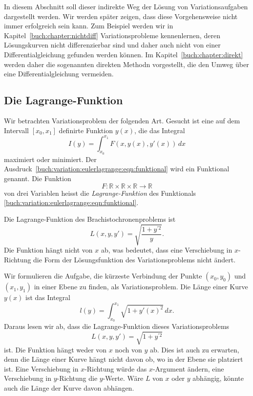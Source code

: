 In diesem Abschnitt soll dieser indirekte Weg der Lösung von
Variationsaufgaben dargestellt werden.
Wir werden später zeigen, dass diese Vorgehensweise nicht immer
erfolgreich sein kann.
Zum Beispiel werden wir in Kapitel~\ref{buch:chapter:nichtdiff}
Variationsprobleme kennenlernen, deren Lösungskurven nicht
differenzierbar sind und daher auch nicht von einer Differentialgleichung
gefunden werden können.
Im Kapitel~\ref{buch:chapter:direkt} werden daher die sogenannten
direkten Methodn vorgestellt, die den Umweg über eine
Differentialgleichung vermeiden.

%
%
\subsection{Die Lagrange-Funktion}
Wir betrachten Variationsproblem der folgenden Art.
Gesucht ist eine auf dem Intervall $[x_0,x_1]$ definirte
Funktion $y(x)$, die das Integral
\begin{equation}
I(y)
=
\int_{x_0}^{x_1}
F(x, y(x), y'(x))
\,dx
\label{buch:variation:eulerlagrange:eqn:funktional}
\end{equation}
maximiert oder minimiert.
Der Ausdruck~\eqref{buch:variation:eulerlagrange:eqn:funktional}
wird ein Funktional genannt.
Die Funktion
\[
F
\colon
\mathbb{R}\times
\mathbb{R}\times
\mathbb{R}
\to
\mathbb{R}
\]
von drei Variablen heisst die {\em Lagrange-Funktion}
des Funktionals \eqref{buch:variation:eulerlagrange:eqn:funktional}.

\begin{beispiel}
Die Lagrange-Funktion des Brachistochronenproblems ist
\[
L(x,y,y')
=
\sqrt{ \frac{1+y^{\prime 2}}{y} }.
\]
Die Funktion hängt nicht von $x$ ab, was bedeutet, dass eine
Verschiebung in $x$-Richtung die Form der Lösungsfunktion des
Variationsproblems nicht ändert.
\end{beispiel}

\begin{beispiel}
\label{buch:variation:eulerlagrange:beispiel:gerade}
Wir formulieren die Aufgabe, die kürzeste Verbindung der Punkte
$(x_0,y_0)$ und $(x_1,y_1)$ in einer Ebene zu finden, als Variationsproblem.
Die Länge einer Kurve $y(x)$ ist das Integral
\[
l(y)
=
\int_{x_0}^{x_1}
\sqrt{1+y'(x)^2}\,dx.
\]
Daraus lesen wir ab, dass die Lagrange-Funktion dieses Variationsproblems
\begin{equation}
L(x,y,y') = \sqrt{1+y^{\prime 2}}
\label{buch:variation:eulerlagrange:eqn:geradeL}
\end{equation}
ist.
Die Funktion hängt weder von $x$ noch von $y$ ab.
Dies ist auch zu erwarten, denn die Länge einer Kurve hängt nicht davon
ob, wo in der Ebene sie platziert ist.
Eine Verschiebung in $x$-Richtung würde das $x$-Argument ändern,
eine Verschiebung in $y$-Richtung die $y$-Werte.
Wäre $L$ von $x$ oder $y$ abhängig, könnte auch die Länge der Kurve
davon abhängen.
\end{beispiel}

